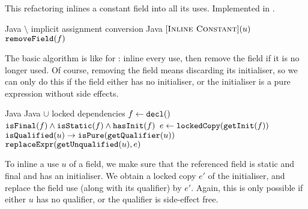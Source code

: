 \subsection{}
This refactoring inlines a constant field into all its uses. Implemented in .

\begin{algorithm}
\caption{$\refactoring{Inline Constant}(f : \type{Field})$}
\begin{algorithmic}[1]
\REQUIRE Java $\setminus$ implicit assignment conversion
\ENSURE Java
\medskip
{}
  \STATE $[\textsc{Inline Constant}](u)$
\ENDFOR
{}
  \STATE $\text{\texttt{removeField}}(f)$
\ENDIF
\end{algorithmic}
\end{algorithm}

The basic algorithm is like for : inline every use, then remove the field if it is no longer used. Of course, removing the field means discarding its initialiser, so we can only do this if the field either has no initialiser, or the initialiser is a pure expression without side effects.

\begin{algorithm}
\caption{$\refactoring{Inline Constant}(u : \type{FieldAccess})$}
\begin{algorithmic}[1]
\REQUIRE Java
\ENSURE Java $\cup$ locked dependencies
\medskip
\STATE $f \leftarrow \text{\texttt{decl}}()$
\STATE \assert $\text{\texttt{isFinal}}(f) \wedge \text{\texttt{isStatic}}(f) \wedge \text{\texttt{hasInit}}(f)$
\STATE $e \leftarrow \text{\texttt{lockedCopy}}(\text{\texttt{getInit}}(f))$
\STATE \assert $\text{\texttt{isQualified}}(u) \rightarrow \text{\texttt{isPure}}(\text{\texttt{getQualifier}}(u))$
\STATE $\text{\texttt{replaceExpr}}(\text{\texttt{getUnqualified}}(u), e)$
\end{algorithmic}
\end{algorithm}

To inline a use $u$ of a field, we make sure that the referenced field is static and final and has an initialiser. We obtain a locked copy $e'$ of the initialiser, and replace the field use (along with its qualifier) by $e'$. Again, this is only possible if either $u$ has no qualifier, or the qualifier is side-effect free.
